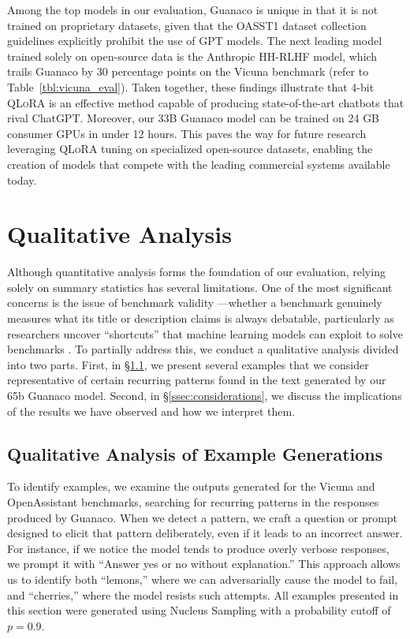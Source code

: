 Among the top models in our evaluation, {Guanaco} is unique in that it is not trained on proprietary datasets, given that the OASST1 dataset collection guidelines explicitly prohibit the use of GPT models. The next leading model trained solely on open-source data is the Anthropic HH-RLHF model, which trails {Guanaco} by 30 percentage points on the Vicuna benchmark (refer to Table~\ref{tbl:vicuna_eval}). Taken together, these findings illustrate that 4-bit \textsc{QLoRA} is an effective method capable of producing state-of-the-art chatbots that rival ChatGPT. Moreover, our 33B {Guanaco} model can be trained on 24 GB consumer GPUs in under 12 hours. This paves the way for future research leveraging \textsc{QLoRA} tuning on specialized open-source datasets, enabling the creation of models that compete with the leading commercial systems available today.

\section{Qualitative Analysis}

Although quantitative analysis forms the foundation of our evaluation, relying solely on summary statistics has several limitations. One of the most significant concerns is the issue of benchmark validity \citep{liao2021we}—whether a benchmark genuinely measures what its title or description claims is always debatable, particularly as researchers uncover ``shortcuts'' that machine learning models can exploit to solve benchmarks \citep{gururangan2018annotation, poliak2018hypothesis}. To partially address this, we conduct a qualitative analysis divided into two parts. First, in \S\ref{ssec:examples}, we present several examples that we consider representative of certain recurring patterns found in the text generated by our 65b {Guanaco} model. Second, in \S\ref{ssec:considerations}, we discuss the implications of the results we have observed and how we interpret them.

\subsection{Qualitative Analysis of Example Generations}
\label{ssec:examples}

To identify examples, we examine the outputs generated for the Vicuna and OpenAssistant benchmarks, searching for recurring patterns in the responses produced by {Guanaco}. When we detect a pattern, we craft a question or prompt designed to elicit that pattern deliberately, even if it leads to an incorrect answer. For instance, if we notice the model tends to produce overly verbose responses, we prompt it with ``Answer yes or no without explanation.'' This approach allows us to identify both ``lemons,'' where we can adversarially cause the model to fail, and ``cherries,'' where the model resists such attempts. All examples presented in this section were generated using Nucleus Sampling \cite{holtzmancurious} with a probability cutoff of $p=0.9$.

